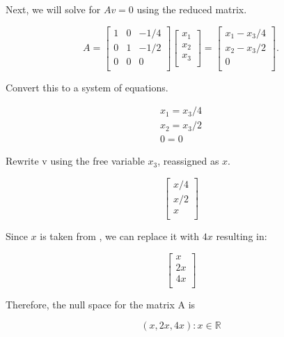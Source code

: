 \documentclass[11pt,addpoints]{exam}
\begin{document}
\begin{questions}
Next, we will solve for $A v = 0$ using the reduced matrix.

\[
A = \begin{bmatrix}
1 & 0 & -1/4 \\
0 & 1 & -1/2 \\
0 & 0 & 0 \\
\end{bmatrix}
\begin{bmatrix}
x_1\\
x_2\\
x_3 \\
\end{bmatrix} =
\begin{bmatrix}
x_1-x_3/4 \\
x_2-x_3/2\\
0 \\
\end{bmatrix}.
\]

Convert this to a system of equations.

\begin{align*}
x_1 = x_3/4\\
x_2 = x_3/2\\
0 = 0
\end{align*}

Rewrite v using the free variable $x_3$, reassigned as $x$.

\[\begin{bmatrix}
x/4 \\
x/2\\
x \\
\end{bmatrix}\]

Since $x$ is taken from , we can replace it with $4x$ resulting in:

\[\begin{bmatrix}
x \\
2x\\
4x \\
\end{bmatrix}\]

Therefore, the null space for the matrix A is

\[ (x, 2x, 4x) : x \in \mathbb{R} \]\\


\end{questions}
\end{document}
